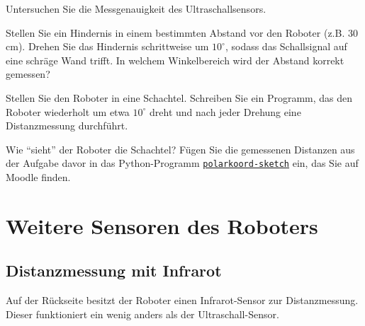 
\begin{myexercise}
    Untersuchen Sie die Messgenauigkeit des Ultraschallsensors.
    \begin{aenum}
        \item Stellen Sie ein Hindernis in einem bestimmten Abstand vor den Roboter (z.B. 30 cm). Drehen Sie das Hindernis schrittweise um \(10^\circ\), sodass das Schallsignal auf eine schräge Wand trifft. In welchem Winkelbereich wird der Abstand korrekt gemessen?
        \item Stellen Sie den Roboter in eine Schachtel. Schreiben Sie ein Programm, das den Roboter wiederholt um etwa \(10^\circ\) dreht und nach jeder Drehung eine Distanzmessung durchführt.
        \item Wie \enquote{sieht} der Roboter die Schachtel? Fügen Sie die gemessenen Distanzen aus der Aufgabe davor in das Python-Programm \hyperref[lst:polarkoord-sketch]{\texttt{polarkoord-sketch}} ein, das Sie auf Moodle finden.
    \end{aenum}
\end{myexercise}


\clearpage

\section{Weitere Sensoren des Roboters}
\subsection{Distanzmessung mit Infrarot}
Auf der Rückseite besitzt der Roboter einen Infrarot-Sensor zur Distanzmessung. Dieser funktioniert ein wenig anders als der Ultraschall-Sensor.


